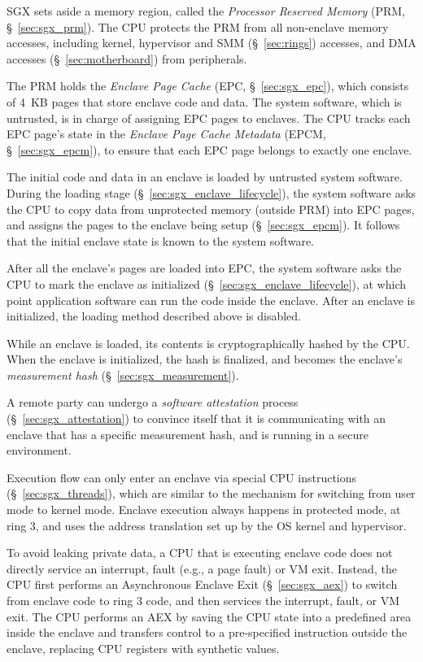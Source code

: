 SGX sets aside a memory region, called the \textit{Processor Reserved Memory}
(PRM, \S~\ref{sec:sgx_prm}). The CPU protects the PRM from all non-enclave
memory accesses, including kernel, hypervisor and SMM (\S~\ref{sec:rings})
accesses, and DMA accesses (\S~\ref{sec:motherboard}) from peripherals.

The PRM holds the \textit{Enclave Page Cache} (EPC, \S~\ref{sec:sgx_epc}),
which consists of 4~KB pages that store enclave code and data. The system
software, which is untrusted, is in charge of assigning EPC pages to enclaves.
The CPU tracks each EPC page's state in the \textit{Enclave Page Cache
Metadata} (EPCM, \S~\ref{sec:sgx_epcm}), to ensure that each EPC page belongs
to exactly one enclave.

The initial code and data in an enclave is loaded by untrusted system software.
During the loading stage (\S~\ref{sec:sgx_enclave_lifecycle}), the system
software asks the CPU to copy data from unprotected memory (outside PRM) into
EPC pages, and assigns the pages to the enclave being setup
(\S~\ref{sec:sgx_epcm}). It follows that the initial enclave state is known to
the system software.

After all the enclave's pages are loaded into EPC, the system software asks the
CPU to mark the enclave as initialized (\S~\ref{sec:sgx_enclave_lifecycle}), at
which point application software can run the code inside the enclave. After an
enclave is initialized, the loading method described above is disabled.

While an enclave is loaded, its contents is cryptographically hashed by the
CPU. When the enclave is initialized, the hash is finalized, and becomes the
enclave's \textit{measurement hash} (\S~\ref{sec:sgx_measurement}).

A remote party can undergo a \textit{software attestation} process
(\S~\ref{sec:sgx_attestation}) to convince itself that it is communicating with
an enclave that has a specific measurement hash, and is running in a secure
environment.

Execution flow can only enter an enclave via special CPU instructions
(\S~\ref{sec:sgx_threads}), which are similar to the mechanism for switching
from user mode to kernel mode. Enclave execution always happens in protected
mode, at ring 3, and uses the address translation set up by the OS kernel and
hypervisor.

To avoid leaking private data, a CPU that is executing enclave code does not
directly service an interrupt, fault (e.g., a page fault) or VM exit. Instead,
the CPU first performs an Asynchronous Enclave Exit (\S~\ref{sec:sgx_aex}) to
switch from enclave code to ring 3 code, and then services the interrupt,
fault, or VM exit.  The CPU performs an AEX by saving the CPU state into a
predefined area inside the enclave and transfers control to a pre-specified
instruction outside the enclave, replacing CPU registers with synthetic values.

